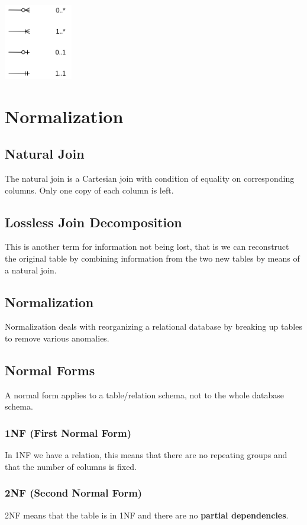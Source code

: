 \documentclass{article}
\begin{document}
\centerline{\includegraphics[width=3cm]{./assets/crows.png}}

\section{Normalization}
\subsection{Natural Join}
The natural join is a Cartesian join with condition of equality on corresponding columns. Only one copy of each column is left.

\subsection{Lossless Join Decomposition}
This is another term for information not being lost, that is we can reconstruct the original table by combining information from the two new tables by means of a natural join.

\subsection{Normalization}
Normalization deals with reorganizing a relational database by breaking up tables to remove various anomalies.

\subsection{Normal Forms}
A normal form applies to a table/relation schema, not to the whole database schema.

\subsubsection{1NF (First Normal Form)}
In 1NF we have a relation, this means that there are no repeating groups and that the number of columns is fixed.

\subsubsection{2NF (Second Normal Form)}
2NF means that the table is in 1NF and there are no \textbf{partial dependencies}.
\end{document}
